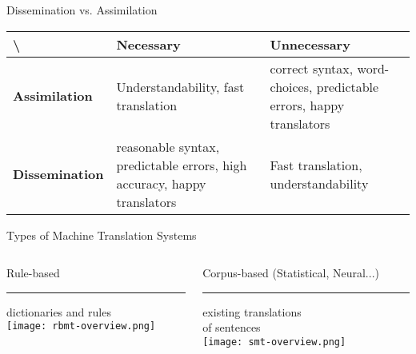 \documentclass{beamer}
\begin{document}
\begin{frame}{Dissemination vs. Assimilation}
    \centering
    \begin{tabular}{|l|p{.33\linewidth}|p{.33\linewidth}|}
        \hline
        \textbackslash & \bf Necessary & \bf Unnecessary \\
        \hline
        \bf Assimilation & 
        Understandability, fast translation & correct syntax, word-choices,
        predictable errors, happy translators\\
        \hline
        \bf Dissemination & reasonable syntax, predictable errors, high
        accuracy, happy translators & Fast translation, understandability \\
    \end{tabular}
\end{frame}

\begin{frame}{Types of Machine Translation Systems}
\begin{columns}[t]
  \begin{column}{0.5\textwidth}
   Rule-based\\
   \hrule
   dictionaries and rules\\
   \texttt{[image: rbmt-overview.png]}
  \end{column}
  \begin{column}{0.5\textwidth}
      Corpus-based (Statistical, Neural...)\\
   \hrule
    existing translations \\
    of sentences \\
   \texttt{[image: smt-overview.png]}
  \end{column}
\end{columns}


\end{frame}
\end{document}
